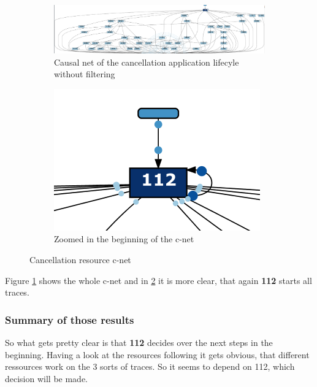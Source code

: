 \begin{figure}[!htbp]
\centering
\begin{subfigure}{0.7\textwidth}
\includegraphics[width = 0.9\linewidth]{CancCNet.PNG}
\caption{Causal net of the cancellation application lifecyle without filtering}
\label{fig:CnetCanc}
\end{subfigure}
\begin{subfigure}{0.2\textwidth}
\includegraphics[width = 0.9\linewidth]{CancCnetBeg.PNG}
\caption{Zoomed in the beginning of the c-net}
\label{fig:CnetCancZoome}
\end{subfigure}
\caption{Cancellation resource c-net}
\label{fig:CnetCancto}
\end{figure}

Figure \ref{fig:CnetCanc} shows the whole c-net and in \ref{fig:CnetCancZoome} it is more clear, that again \textbf{112} starts all traces.

\subsubsection{Summary of those results}

So what gets pretty clear is that \textbf{112} decides over the next steps in the beginning. Having a look at the resources following it gets obvious, that different ressources work on the 3 sorts of traces. So it seems to depend on 112, which decision will be made.


